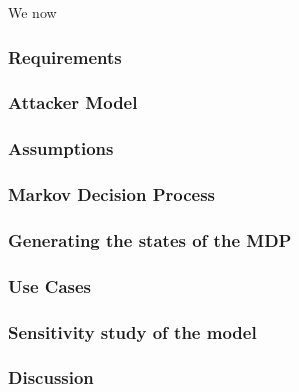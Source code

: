 We now


\subsubsection{Requirements}




\subsubsection{Attacker Model}


\subsubsection{Assumptions}


\subsubsection{Markov Decision Process}


\subsubsection{Generating the states of the MDP}
 

\subsubsection{Use Cases}


\subsubsection{Sensitivity study of the model}

\subsubsection{Discussion}
